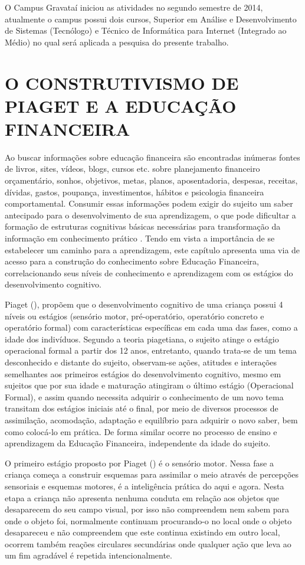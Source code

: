 O Campus Gravataí iniciou as atividades no segundo semestre de 2014, atualmente o campus possui dois cursos, Superior em Análise e Desenvolvimento de Sistemas (Tecnólogo) e Técnico de Informática para Internet (Integrado ao Médio) no qual será aplicada a pesquisa do presente trabalho.

\section{O CONSTRUTIVISMO DE PIAGET  E A EDUCAÇÃO FINANCEIRA}
Ao buscar informações sobre educação financeira são encontradas inúmeras fontes de livros, sites, vídeos, blogs, cursos etc. sobre planejamento financeiro orçamentário, sonhos, objetivos, metas, planos, aposentadoria, despesas, receitas, dívidas, gastos, poupança, investimentos, hábitos e psicologia financeira comportamental. Consumir essas informações podem exigir do sujeito um saber antecipado para o desenvolvimento de sua aprendizagem, o que pode dificultar a formação de estruturas cognitivas básicas necessárias para transformação da informação em conhecimento prático \cite{piaget2011}. Tendo em vista a importância de se estabelecer um caminho para a aprendizagem, este capítulo apresenta uma via de acesso para a construção do conhecimento sobre Educação Financeira, correlacionando seus níveis de conhecimento e aprendizagem com os estágios do desenvolvimento cognitivo.

Piaget (\citeyear{piaget1971}), propõem que o desenvolvimento cognitivo de uma criança possui 4 níveis ou estágios (sensório motor, pré-operatório, operatório concreto e operatório formal) com características específicas em cada uma das fases, como a idade dos indivíduos. Segundo a teoria piagetiana, o sujeito atinge o estágio operacional formal a partir dos 12 anos, entretanto, quando trata-se de um tema desconhecido e distante do sujeito, observam-se ações, atitudes e interações semelhantes aos primeiros estágios do desenvolvimento cognitivo, mesmo em sujeitos que por sua idade e maturação atingiram o último estágio (Operacional Formal), e assim quando necessita adquirir o conhecimento de um novo tema transitam dos estágios iniciais até o final, por meio de diversos processos de assimilação, acomodação, adaptação e equilíbrio para adquirir o novo saber, bem como colocá-lo em prática. De forma similar ocorre no processo de ensino e aprendizagem da Educação Financeira, independente da idade do sujeito.

O primeiro estágio proposto por Piaget (\citeyear{piaget1971}) é o sensório motor. Nessa fase a criança começa a construir esquemas para assimilar o meio através de percepções sensoriais e esquemas motores, é a inteligência prática do aqui e agora. Nesta etapa a criança não apresenta nenhuma conduta em relação aos objetos que desaparecem do seu campo visual, por isso não compreendem nem sabem para onde o objeto foi, normalmente continuam procurando-o no local onde o objeto desapareceu e não compreendem que este continua existindo em outro local, ocorrem também reações circulares secundárias onde qualquer ação que leva ao um fim agradável é repetida intencionalmente. 

